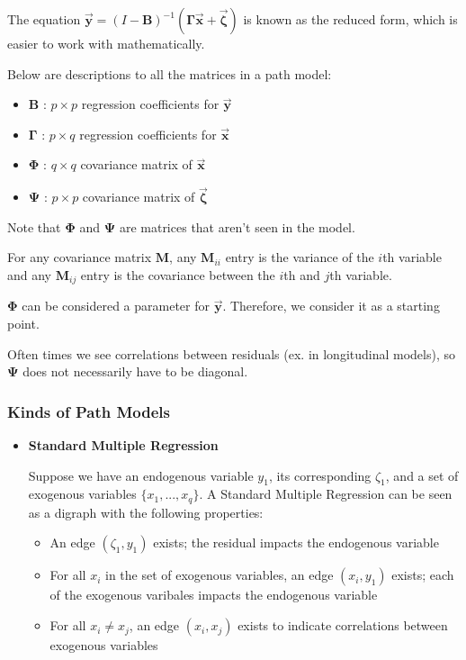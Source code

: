 \documentclass{article}
\begin{document}
\begin{multicols*}{2}
The equation $\mathbf{\vec{y}} = (I - \mathbf{B})^{-1}(\mathbf{\Gamma} \mathbf{\vec{x}} + \mathbf{\vec{\zeta}})$ is known as the reduced form, which is easier to work with mathematically.

Below are descriptions to all the matrices in a path model:
\begin{itemize}
    \item $\mathbf{B}$ : $p \times p$ regression coefficients for $\mathbf{\vec{y}}$
    \item $\mathbf{\Gamma}$ : $p \times q$ regression coefficients for $\mathbf{\vec{x}}$
    \item $\mathbf{\Phi}$ : $q \times q$ covariance matrix of $\mathbf{\vec{x}}$
    \item $\mathbf{\Psi}$ : $p \times p$ covariance matrix of $\mathbf{\vec{\zeta}}$
\end{itemize}

Note that $\mathbf{\Phi}$ and $\mathbf{\Psi}$ are matrices that aren't seen in the model. 

For any covariance matrix $\mathbf{M}$, any $\mathbf{M}_{ii}$ entry is the variance of the $i$th variable and any $\mathbf{M}_{ij}$ entry is the covariance between the $i$th and $j$th variable.

$\mathbf{\Phi}$ can be considered a parameter for $\mathbf{\vec{y}}$. Therefore, we consider it as a starting point.

Often times we see correlations between residuals (ex. in longitudinal models), so $\mathbf{\Psi}$ does not necessarily have to be diagonal.

\subsubsection{Kinds of Path Models}

\begin{itemize}
    \item \textbf{Standard Multiple Regression}

    Suppose we have an endogenous variable $y_1$, its corresponding $\zeta_1$, and a set of exogenous variables $\{x_1,...,x_q\}$. A Standard Multiple Regression can be seen as a digraph with the following properties:
    
    \begin{itemize}
        \item An edge $(\zeta_1, y_1)$ exists; the residual impacts the endogenous variable
        \item For all $x_i$ in the set of exogenous variables, an edge $(x_i, y_1)$ exists; each of the exogenous varibales impacts the endogenous variable
        \item For all $x_i \neq x_j$, an edge $(x_i, x_j)$ exists to indicate correlations between exogenous variables
        

\end{itemize}
\end{itemize}
\end{multicols*}
\end{document}
